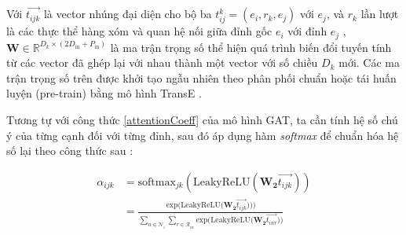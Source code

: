 Với $\overrightarrow{t_{ijk}}$ là vector nhúng đại diện cho bộ ba  $t_{ij}^k = (e_i, r_k, e_j)$ với $e_j$, và $r_k$ lần lượt là các thực thể hàng xóm và quan hệ nối giữa đỉnh gốc $e_i$ với đỉnh $e_j$ , $\mathbf{W} \in \mathbb{R}^{D_k \times (2 D_{\text{in}} + P_{\text{in}})}$ là ma trận trọng số thể hiện quá trình biến đổi tuyến tính từ các vector đã ghép lại với nhau thành một vector với số chiều $D_k$ mới. Các ma trận trọng số trên được khởi tạo ngẫu nhiên theo phân phối chuẩn hoặc tái huấn luyện (pre-train) bằng mô hình TransE \cite{bordes2013translating}.

Tương tự với công thức \ref{attentionCoeff} của mô hình GAT, ta cần tính hệ số chú ý của từng cạnh đối với từng đỉnh, sau đó áp dụng hàm \textit{softmax} để chuẩn hóa hệ số lại theo công thức sau :

\begin{equation}
	\label{attentionRelationCoeff}
	\begin{split}
		\alpha_{ijk}& = \text{softmax}_{jk}(\text{LeakyReLU}(\mathbf{W_2} \overrightarrow{t_{ijk}}))\\
		&= \frac{
			\text{exp} \Big( \text{LeakyReLU} \Big( \mathbf{W_2} \overrightarrow{t_{ijk}}\Big) \Big))
		}
		{
			\sum_{n\in \mathcal{N}_i} \sum_{r\in \mathcal{R}_{in}}
			\text{exp} \Big( \text{LeakyReLU} \Big( \mathbf{W_2} \overrightarrow{t_{inr}} \Big) \Big)
		}
	\end{split}
\end{equation}

